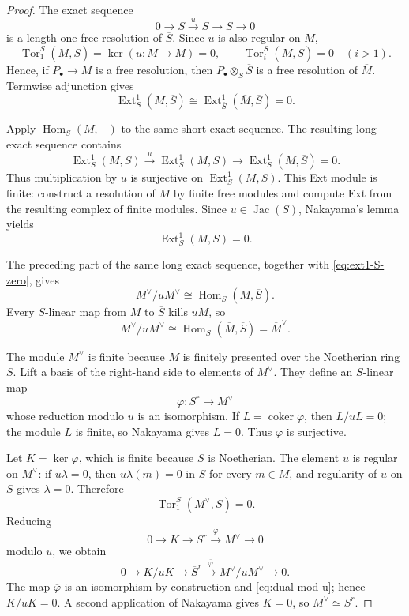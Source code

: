 \documentclass[reqno]{amsart}
\theoremstyle{plain}
\theoremstyle{definition}
\newcommand{\Jac}{\operatorname{Jac}}
\newcommand{\Ext}{\operatorname{Ext}}
\newcommand{\Tor}{\operatorname{Tor}}
\newcommand{\Hom}{\operatorname{Hom}}
\begin{document}
\begin{proof}
The exact sequence
\[
 0\longrightarrow S\xrightarrow{\,u\,}S
 \longrightarrow\overline S\longrightarrow0
\]
is a length-one free resolution of $\overline S$.  Since $u$ is also
regular on $M$,
\[
 \Tor^S_1(M,\overline S)=\ker(u:M\to M)=0,
 \qquad
 \Tor^S_i(M,\overline S)=0\quad(i>1).
\]
Hence, if $P_\bullet\to M$ is a free resolution, then
$P_\bullet\otimes_S\overline S$ is a free resolution of
$\overline M$.  Termwise adjunction gives
\[
 \Ext^1_S(M,\overline S)
 \cong\Ext^1_{\overline S}(\overline M,\overline S)=0.
\]

Apply $\Hom_S(M,-)$ to the same short exact sequence.  The resulting long
exact sequence contains
\[
 \Ext^1_S(M,S)\xrightarrow{\,u\,}\Ext^1_S(M,S)
 \longrightarrow\Ext^1_S(M,\overline S)=0.
\]
Thus multiplication by $u$ is surjective on $\Ext^1_S(M,S)$.  This Ext
module is finite: construct a resolution of $M$ by finite free modules and
compute Ext from the resulting complex of finite modules.  Since
$u\in\Jac(S)$, Nakayama's lemma
\cite[Proposition~2.6]{AtiyahMacdonald} yields
\begin{equation}
\label{eq:ext1-S-zero}
 \Ext^1_S(M,S)=0.
\end{equation}

The preceding part of the same long exact sequence, together with
\eqref{eq:ext1-S-zero}, gives
\[
 M^\vee/uM^\vee
 \cong\Hom_S(M,\overline S).
\]
Every $S$-linear map from $M$ to $\overline S$ kills $uM$, so
\begin{equation}
\label{eq:dual-mod-u}
 M^\vee/uM^\vee
 \cong\Hom_{\overline S}(\overline M,\overline S)
 =\overline M^\vee.
\end{equation}

The module $M^\vee$ is finite because $M$ is finitely presented over the
Noetherian ring $S$.  Lift a basis of the right-hand side to elements of
$M^\vee$.  They define
an $S$-linear map
\[
 \varphi:S^r\longrightarrow M^\vee
\]
whose reduction modulo $u$ is an isomorphism.  If
$L=\operatorname{coker}\varphi$, then $L/uL=0$; the module $L$ is finite,
so Nakayama gives
$L=0$.  Thus $\varphi$ is surjective.

Let $K=\ker\varphi$, which is finite because $S$ is Noetherian.  The
element $u$ is regular on $M^\vee$: if $u\lambda=0$, then
$u\lambda(m)=0$ in $S$ for every $m\in M$, and regularity of $u$ on
$S$ gives $\lambda=0$.  Therefore
\[
 \Tor^S_1(M^\vee,\overline S)=0.
\]
Reducing
\[
 0\longrightarrow K\longrightarrow S^r
 \xrightarrow{\varphi}M^\vee\longrightarrow0
\]
modulo $u$, we obtain
\[
 0\longrightarrow K/uK\longrightarrow\overline S^r
 \xrightarrow{\overline\varphi}M^\vee/uM^\vee
 \longrightarrow0.
\]
The map $\overline\varphi$ is an isomorphism by construction and
\eqref{eq:dual-mod-u}; hence $K/uK=0$.  A second application of Nakayama
gives $K=0$, so $M^\vee\simeq S^r$.
\end{proof}
\end{document}
